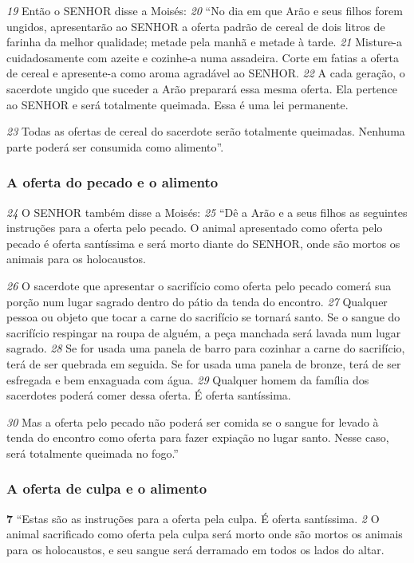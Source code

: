 \bigskip
\textit{\tiny 19}
Então o SENHOR disse a Moisés: 
\textit{\tiny 20}
“No dia em que Arão e seus filhos forem
ungidos, apresentarão ao SENHOR a oferta padrão de cereal de dois litros de
farinha da melhor qualidade; metade pela manhã e metade à tarde. 
\textit{\tiny 21}
Misture-a
cuidadosamente com azeite e cozinhe-a numa assadeira. Corte em fatias a oferta
de cereal e apresente-a como aroma agradável ao SENHOR. 
\textit{\tiny 22}
A cada geração, o
sacerdote ungido que suceder a Arão preparará essa mesma oferta. Ela pertence
ao SENHOR e será totalmente queimada. Essa é uma lei permanente. 

\smallskip
\textit{\tiny 23}
Todas as
ofertas de cereal do sacerdote serão totalmente queimadas. Nenhuma parte
poderá ser consumida como alimento”.

\bigskip
\subsubsection*{A oferta do pecado e o alimento}  
\textit{\tiny 24}
O SENHOR também disse a Moisés: 
\textit{\tiny 25}
“Dê a Arão e a seus filhos as seguintes
instruções para a oferta pelo pecado. O animal apresentado como oferta pelo
pecado é oferta santíssima e será morto diante do SENHOR, onde são mortos os
animais para os holocaustos. 

\smallskip
\textit{\tiny 26}
O sacerdote que apresentar o sacrifício como
oferta pelo pecado comerá sua porção num lugar sagrado dentro do pátio da
tenda do encontro. 
\textit{\tiny 27}
Qualquer pessoa ou objeto que tocar a carne do sacrifício se
tornará santo. Se o sangue do sacrifício respingar na roupa de alguém, a peça
manchada será lavada num lugar sagrado. 
\textit{\tiny 28}
Se for usada uma panela de barro
para cozinhar a carne do sacrifício, terá de ser quebrada em seguida. Se for usada
uma panela de bronze, terá de ser esfregada e bem enxaguada com água.
\textit{\tiny 29}
Qualquer homem da família dos sacerdotes poderá comer dessa oferta. É oferta
santíssima. 

\smallskip
\textit{\tiny 30}
Mas a oferta pelo pecado não poderá ser comida se o sangue for
levado à tenda do encontro como oferta para fazer expiação no lugar santo. Nesse
caso, será totalmente queimada no fogo.”
   
\bigskip
\subsubsection*{A oferta de culpa e o alimento}  
\textbf{\large 7} “Estas são as instruções para a oferta pela culpa. É oferta santíssima. 
\textit{\tiny 2} 
O animal sacrificado como oferta pela culpa será morto onde são mortos os animais
para os holocaustos, e seu sangue será derramado em todos os lados do altar. 

